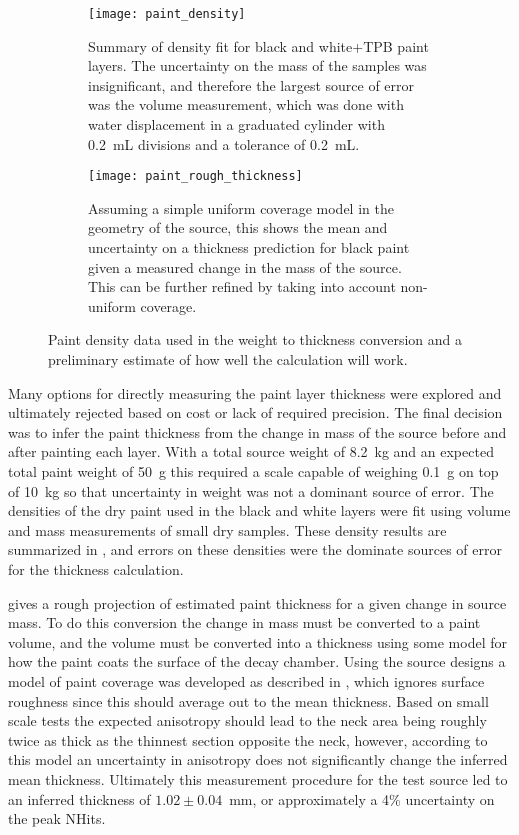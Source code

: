 \begin{figure}[h!]
\begin{subfigure}{.45\textwidth}
  \texttt{[image: paint\_density]}
  \caption{Summary of density fit for black and white+TPB paint layers. The uncertainty on the mass of the samples was insignificant, and therefore the largest source of error was the volume measurement, which was done with water displacement in a graduated cylinder with 0.2~mL divisions and a tolerance of 0.2~mL.}
  \label{fig:paintdensity}
\end{subfigure}
\hspace{0.5cm}
\begin{subfigure}{.45\textwidth}
  \texttt{[image: paint\_rough\_thickness]}
  \caption{Assuming a simple uniform coverage model in the geometry of the source, this shows the mean and uncertainty on a thickness prediction for black paint given a measured change in the mass of the source. This can be further refined by taking into account non-uniform coverage. }
  \label{fig:paintthickness}
\end{subfigure}
\caption{Paint density data used in the weight to thickness conversion and a preliminary estimate of how well the calculation will work.}
\label{fig:weightmeasure}
\end{figure}

Many options for directly measuring the paint layer thickness were explored and ultimately rejected based on cost or lack of required precision. The final decision was to infer the paint thickness from the change in mass of the source before and after painting each layer. With a total source weight of 8.2~kg and an expected total paint weight of 50~g this required a scale capable of weighing 0.1~g on top of 10~kg so that uncertainty in weight was not a dominant source of error. The densities of the dry paint used in the black and white layers were fit using volume and mass measurements of small dry samples. These density results are summarized in , and errors on these densities were the dominate sources of error for the thickness calculation. 

 gives a rough projection of estimated paint thickness for a given change in source mass. To do this conversion the change in mass must be converted to a paint volume, and the volume must be converted into a thickness using some model for how the paint coats the surface of the decay chamber. Using the source designs a model of paint coverage was developed as described in , which ignores surface roughness since this should average out to the mean thickness. Based on small scale tests the expected anisotropy should lead to the neck area being roughly twice as thick as the thinnest section opposite the neck, however, according to this model an uncertainty in anisotropy does not significantly change the inferred mean thickness. Ultimately this measurement procedure for the test source led to an inferred thickness of $1.02\pm0.04$~mm, or approximately a 4\% uncertainty on the peak NHits.

